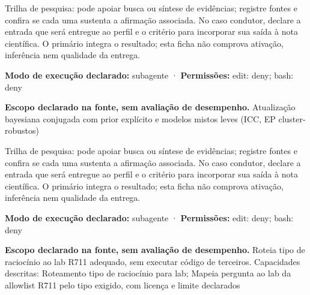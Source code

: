\begin{funcao}
Trilha de pesquisa: pode apoiar busca ou síntese de evidências; registre fontes e confira se cada uma sustenta a afirmação associada. No caso condutor, declare a entrada que será entregue ao perfil e o critério para incorporar sua saída à nota científica. O primário integra o resultado; esta ficha não comprova ativação, inferência nem qualidade da entrega.
\end{funcao}

\begin{arquitetura}
\textbf{Modo de execução declarado:} subagente · \textbf{Permissões:} edit: deny; bash: deny
\end{arquitetura}


\begin{descricao}
\textbf{Escopo declarado na fonte, sem avaliação de desempenho.}
Atualização bayesiana conjugada com prior explícito e modelos mistos leves (ICC, EP cluster-robustos)
\end{descricao}

\begin{funcao}
Trilha de pesquisa: pode apoiar busca ou síntese de evidências; registre fontes e confira se cada uma sustenta a afirmação associada. No caso condutor, declare a entrada que será entregue ao perfil e o critério para incorporar sua saída à nota científica. O primário integra o resultado; esta ficha não comprova ativação, inferência nem qualidade da entrega.
\end{funcao}

\begin{arquitetura}
\textbf{Modo de execução declarado:} subagente · \textbf{Permissões:} edit: deny; bash: deny
\end{arquitetura}


\begin{descricao}
\textbf{Escopo declarado na fonte, sem avaliação de desempenho.}
Roteia tipo de raciocínio ao lab R711 adequado, sem executar código de terceiros. Capacidades descritas: Roteamento tipo de raciocínio para lab; Mapeia pergunta ao lab da allowlist R711 pelo tipo exigido, com licença e limite declarados
\end{descricao}

